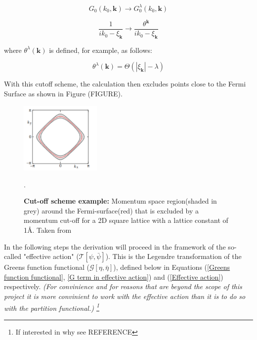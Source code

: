 \documentclass[12pt]{article}
\begin{document}
\begin{equation} \label{propagator transform 1}
    G_0(k_0, \textbf{k}) \rightarrow G_0^{\lambda}(k_0, \textbf{k})
\end{equation}


\begin{equation} \label{propagator transform 2}
    \frac{1}{ik_0 - \xi_{\textbf{k}}} \rightarrow \frac{\theta^{\textbf{k}}}{ik_0 - \xi_{\textbf{k}}}
\end{equation}

\noindent where $\theta^{\lambda}(\textbf{k})$ is defined, for example, as follows:

\begin{equation} \label{theta def}
    \theta^{\lambda}(\textbf{k}) = \Theta(|\xi_{\textbf{k}}| - \lambda)    
\end{equation}

\noindent With this cutoff scheme, the calculation then excludes points close to the Fermi Surface as shown in Figure (FIGURE). \par
\begin{figure}[htbp]  %
    \centering
    \includegraphics[width=0.35\textwidth]{Truncation.png}  %
    \caption{\textbf{Cut-off scheme example:} Momentum space region(shaded in grey) around the Fermi-surface(red) that is excluded 
    by a momentum cut-off for a 2D square lattice with a lattice constant of 1\AA. Taken from \cite {metzner2012functional}}.
    \label{fig:Truncation}
\end{figure}

\medskip
\noindent In the following steps the derivation will proceed in the framework of the  so-called "effective action" ($\mathcal{T}[\psi, \bar{\psi}]$).
This is the Legendre transformation of the Greens function functional ($\mathcal{G}[\eta, \bar{\eta}]$), defined below in Equations (\ref{Greens function functional}, \ref{G term in effective action}) and (\ref{Effective action}) respectively. 
\textit{(For convinience and for reasons that
are beyond the scope of this project it is more convinient to work with the effective action than it is to do so with the partition functional.) \footnote{If interested in why see REFERENCE}}
\end{document}
